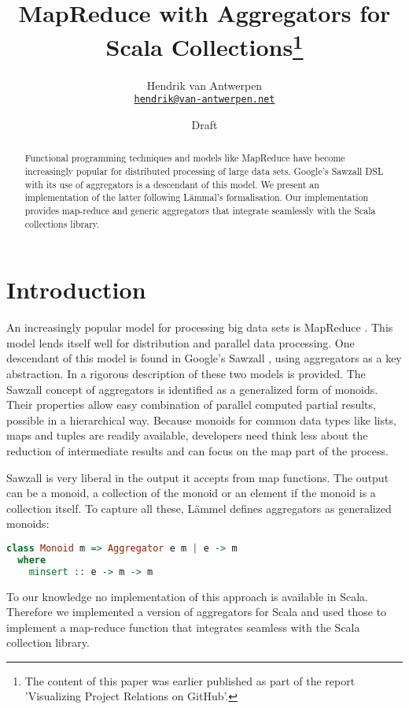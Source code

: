 \documentclass[10pt,a4paper]{article}
\title{MapReduce with Aggregators for Scala Collections\footnote{The content of this paper was earlier published as part of the report 'Visualizing Project Relations on GitHub'.}}
\author{
    Hendrik van Antwerpen\\{\small\href{mailto:hendrik@van-antwerpen.net}{\nolinkurl{hendrik@van-antwerpen.net}}}
}
\date{Draft}
\begin{document}
\maketitle

\begin{abstract}
Functional programming techniques and models like MapReduce have become increasingly popular for distributed processing of large data sets. Google's Sawzall DSL with its use of aggregators is a descendant of this model. We present an implementation of the latter following L\"ammal's formalisation. Our implementation provides map-reduce and generic aggregators that integrate seamlessly with the Scala collections library.
\end{abstract}

\section{Introduction}

An increasingly popular model for processing big data sets is MapReduce \citep{dean2008mapreduce}. This model lends itself well for distribution and parallel data processing. One descendant of this model is found in Google's Sawzall \citep{pike2005interpreting}, using aggregators as a key abstraction. In \cite{lammel2008google} a rigorous description of these two models is provided. The Sawzall concept of aggregators is identified as a generalized form of monoids. Their properties allow easy combination of parallel computed partial results, possible in a hierarchical way. Because monoids for common data types like lists, maps and tuples are readily available, developers need think less about the reduction of intermediate results and can focus on the map part of the process.

Sawzall is very liberal in the output it accepts from map functions. The output can be a monoid, a collection of the monoid or an element if the monoid is a collection itself. To capture all these, L\"ammel defines aggregators as generalized monoids:
\begin{lstlisting}[language=haskell]
class Monoid m => Aggregator e m | e -> m
  where
    minsert :: e -> m -> m
\end{lstlisting}

To our knowledge no implementation of this approach is available in Scala. Therefore we implemented a version of aggregators for Scala and used those to implement a map-reduce function that integrates seamless with the Scala collection library.
\end{document}
